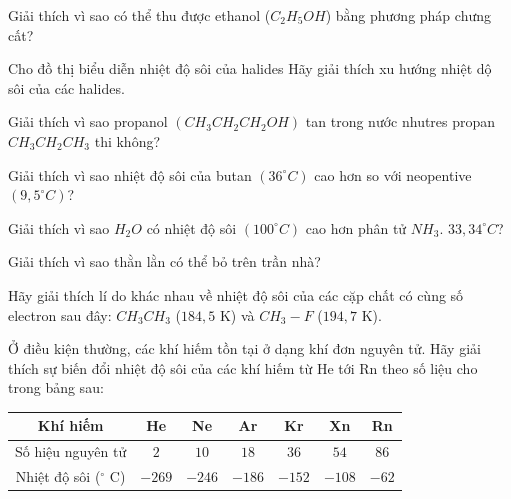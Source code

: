 \begin{bt}
	Giải thích vì sao có thể thu được ethanol ($C_2H_5OH$) bằng phương pháp chưng cất?
	\loigiai{}
\end{bt}
\begin{bt}
	Cho đồ thị biểu diễn nhiệt độ sôi của halides Hãy giải thích xu hướng nhiệt dộ sôi của các halides.
	\loigiai{}
\end{bt}
\begin{bt}
	Giải thích vì sao propanol $\left(CH_3CH_2CH_2OH\right)$ tan trong nước nhutres propan $CH_3CH_2CH_3$ thi không?
	\loigiai{}
\end{bt}
\begin{bt}
	Giải thích vì sao nhiệt độ sôi của butan $\left(36^{\circ} C\right)$ cao hơn so với neopentive $\left(9,5^{\circ} C\right)$?
	\loigiai{}
\end{bt}
\begin{bt}
	Giải thích vì sao $H_2O$ có nhiệt độ sôi $\left(100^{\circ} C\right)$ cao hơn phân tử $NH_3$. $33,34^{\circ} C$?
	\loigiai{}
\end{bt}
\begin{bt}
	Giải thích vì sao thằn lằn có thể bỏ trên trần nhà?
	\loigiai{}
\end{bt}
\begin{bt}
	Hãy giải thích lí do khác nhau về nhiệt độ sôi của các cặp chất có cùng số
	electron sau đây: $CH_3CH_3$ ($184{,}5$ K) và $CH_3-F$ ($194{,}7$ K).
\end{bt}

\begin{bt}
	Ở điều kiện thường, các khí hiếm tồn tại ở dạng khí đơn nguyên tử.
	Hãy giải thích sự biến đổi nhiệt độ sôi của các khí hiếm từ He tới Rn theo số
	liệu cho trong bảng sau:
	\begin{center}
		\begin{tabular}{|c|c|c|c|c|c|c|}
			\hline
			Khí hiếm & He & Ne & Ar & Kr & Xn & Rn \\
			\hline
			Số hiệu nguyên tử & $2$ & $10$ & $18$ & $36$ & $54$ & $86$ \\
			\hline
			Nhiệt độ sôi ($^\circ$ C) & $-269$ & $-246$ & $-186$ & $-152$ & $-108$ & $-62$ \\
			\hline
		\end{tabular}
	\end{center}
\end{bt}

